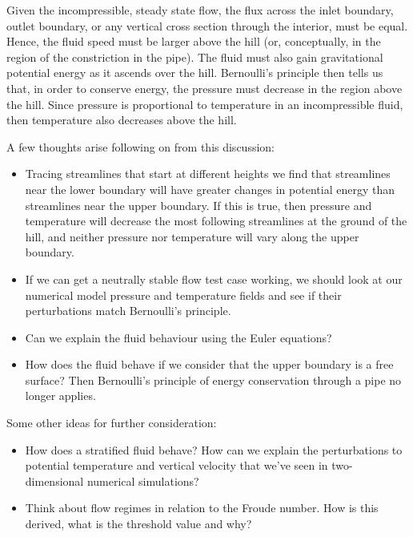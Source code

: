 \documentclass{article}
\begin{document}
Given the incompressible, steady state flow, the flux across the inlet boundary, outlet boundary, or any vertical cross section through the interior, must be equal.  Hence, the fluid speed must be larger above the hill (or, conceptually, in the region of the constriction in the pipe).  The fluid must also gain gravitational potential energy as it ascends over the hill.  Bernoulli's principle then tells us that, in order to conserve energy, the pressure must decrease in the region above the hill.  Since pressure is proportional to temperature in an incompressible fluid, then temperature also decreases above the hill.

A few thoughts arise following on from this discussion:
\begin{itemize}
	\item Tracing streamlines that start at different heights we find that streamlines near the lower boundary will have greater changes in potential energy than streamlines near the upper boundary.  If this is true, then pressure and temperature will decrease the most following streamlines at the ground of the hill, and neither pressure nor temperature will vary along the upper boundary.
	\item If we can get a neutrally stable flow test case working, we should look at our numerical model pressure and temperature fields and see if their perturbations match Bernoulli's principle.
	\item Can we explain the fluid behaviour using the Euler equations?
	\item How does the fluid behave if we consider that the upper boundary is a free surface?  Then Bernoulli's principle of energy conservation through a pipe no longer applies.
\end{itemize}
Some other ideas for further consideration:
\begin{itemize}
	\item How does a stratified fluid behave?  How can we explain the perturbations to potential temperature and vertical velocity that we've seen in two-dimensional numerical simulations?
	\item Think about flow regimes in relation to the Froude number.  How is this derived, what is the threshold value and why?
\end{itemize}
\end{document}
